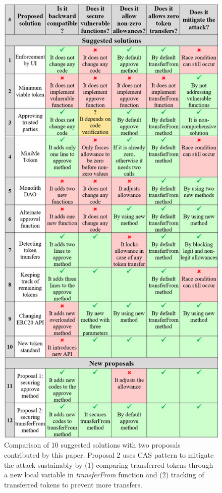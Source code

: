 \begin{figure}[t!]
	\centering
	\includegraphics[width=0.9\linewidth]{figures/multiple_withdrawal_04.png}
	\caption{Comparison of 10 suggested solutions with two proposals contributed by this paper. Proposal 2 uses CAS pattern to mitigate the attack sustainably by (1) comparing transferred tokens through a new local variable in \textit{transferFrom} function and (2) tracking of transferred tokens to prevent more transfers.\label{tab:comp}}
\end{figure}
